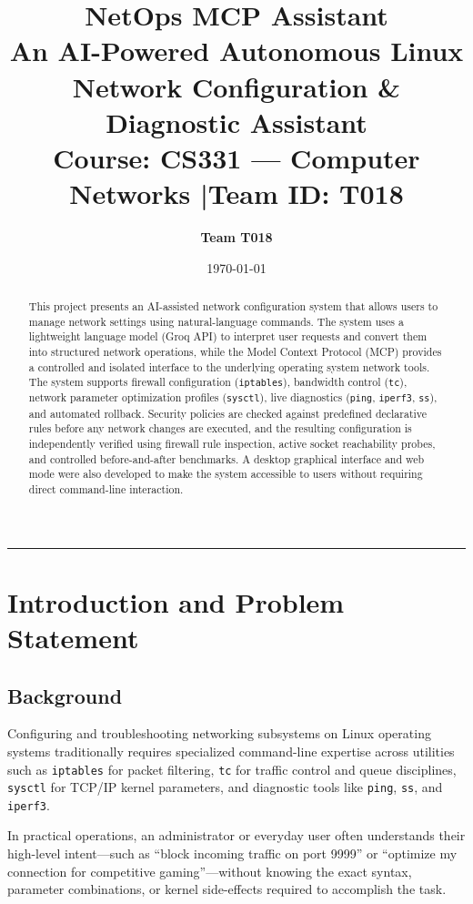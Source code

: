 \documentclass[11pt,a4paper]{article}
\title{\textbf{NetOps MCP Assistant}\\[0.3em]
\large An AI-Powered Autonomous Linux Network Configuration \& Diagnostic Assistant\\[0.5em]
\normalsize Course: CS331 --- Computer Networks \quad|\quad Team ID: T018}
\author{\textbf{Team T018}}
\date{\today}
\begin{document}
\maketitle

\begin{abstract}
This project presents an AI-assisted network configuration system that allows users to manage network settings using natural-language commands. The system uses a lightweight language model (Groq API) to interpret user requests and convert them into structured network operations, while the Model Context Protocol (MCP) provides a controlled and isolated interface to the underlying operating system network tools. The system supports firewall configuration (\texttt{iptables}), bandwidth control (\texttt{tc}), network parameter optimization profiles (\texttt{sysctl}), live diagnostics (\texttt{ping}, \texttt{iperf3}, \texttt{ss}), and automated rollback. Security policies are checked against predefined declarative rules before any network changes are executed, and the resulting configuration is independently verified using firewall rule inspection, active socket reachability probes, and controlled before-and-after benchmarks. A desktop graphical interface and web mode were also developed to make the system accessible to users without requiring direct command-line interaction.
\end{abstract}

\vspace{1em}
\hrule
\vspace{1em}

\section{Introduction and Problem Statement}

\subsection{Background}
Configuring and troubleshooting networking subsystems on Linux operating systems traditionally requires specialized command-line expertise across utilities such as \texttt{iptables} for packet filtering, \texttt{tc} for traffic control and queue disciplines, \texttt{sysctl} for TCP/IP kernel parameters, and diagnostic tools like \texttt{ping}, \texttt{ss}, and \texttt{iperf3}.

In practical operations, an administrator or everyday user often understands their high-level intent---such as ``block incoming traffic on port 9999'' or ``optimize my connection for competitive gaming''---without knowing the exact syntax, parameter combinations, or kernel side-effects required to accomplish the task.
\end{document}
